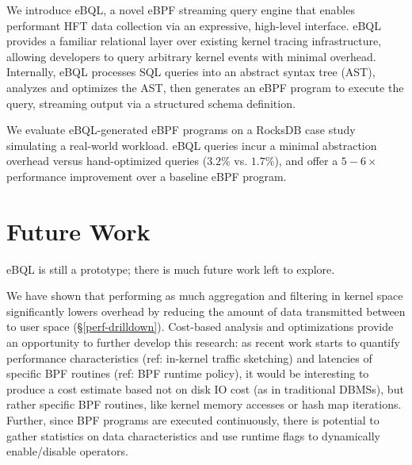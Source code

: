 \documentclass[11pt,a4paper]{article}
\begin{document}

We introduce eBQL, a novel eBPF streaming query engine that enables performant HFT data collection
via an expressive, high-level interface. eBQL provides a familiar relational layer over existing
kernel tracing infrastructure, allowing developers to query arbitrary kernel events with minimal
overhead. Internally, eBQL processes SQL queries into an abstract syntax tree (AST), analyzes and
optimizes the AST, then generates an eBPF program to execute the query, streaming output via a
structured schema definition.

We evaluate eBQL-generated eBPF programs on a RocksDB case study simulating a real-world workload.
eBQL queries incur a minimal abstraction overhead versus hand-optimized queries ($3.2\%$ vs.
$1.7\%$), and offer a $5-6\times$ performance improvement over a baseline eBPF program.

\newpage











\section{Future Work}

eBQL is still a prototype; there is much future work left to explore.

We have shown that performing as much aggregation and filtering in kernel space significantly lowers
overhead by reducing the amount of data transmitted between to user space (\S \ref{perf-drilldown}).
Cost-based analysis and optimizations provide an opportunity to further develop this research: as
recent work starts to quantify performance characteristics (ref: in-kernel traffic sketching) and
latencies of specific BPF routines (ref: BPF runtime policy), it would be interesting to produce a
cost estimate based not on disk IO cost (as in traditional DBMSs), but rather specific BPF routines,
like kernel memory accesses or hash map iterations. Further, since BPF programs are executed
continuously, there is potential to gather statistics on data characteristics and use runtime flags
to dynamically enable/disable operators.
\end{document}
